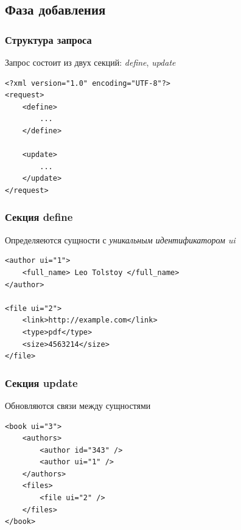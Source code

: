 \documentclass[utf8,handout]{beamer}
\begin{document}
	\subsection{Фаза добавления}
		\begin{frame}[fragile]
 			\frametitle{Структура запроса}
 			Запрос состоит из двух секций: {\em define}, {\em update}
 			\begin{block}{}
	 			\begin{verbatim}
<?xml version="1.0" encoding="UTF-8"?>
<request>
    <define>
        ...
    </define>

    <update>
        ...
    </update>
</request>
				\end{verbatim}
			\end{block}
		\end{frame}
	
		\begin{frame}[fragile]
 			\frametitle{Секция define}
  			Определяеются сущности с {\em уникальным идентификатором ui}
 			\begin{block}{}
	 			\begin{verbatim}
<author ui="1">
    <full_name> Leo Tolstoy </full_name>
</author>

<file ui="2">
    <link>http://example.com</link>
    <type>pdf</type>
    <size>4563214</size>
</file>
				\end{verbatim}
			\end{block}
		\end{frame}
	
		\begin{frame}[fragile]
 			\frametitle{Секция update}
 			Обновляются связи между сущностями
 			\begin{block}{}
	 			\begin{verbatim}
<book ui="3">
    <authors>
        <author id="343" />
        <author ui="1" />
    </authors>
    <files>
        <file ui="2" />
    </files>
</book>
				\end{verbatim}
			\end{block} 			
		\end{frame}
	
\end{document}

